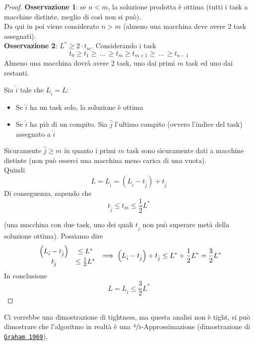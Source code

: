 \begin{proof}
	\textbf{Osservazione 1}: se $n<m$, la soluzione prodotta è ottima (tutti i task a macchine distinte, meglio di così non si può).\\
	
	Da qui in poi viene considerato $n>m$ (almeno una macchina deve avere 2 task assegnati).\\
	
	\textbf{Osservazione 2}: $L^\ast \geq 2 \cdot t_m$. Considerando i task
	$$ t_0 \geq t_1 \geq \, ... \, \geq t_m \geq t_{m+1} \geq \, ... \, \geq t_{n-1} $$
	Almeno una macchina dovrà avere 2 task, uno dai primi $m$ task ed uno dai restanti.\\
	
	\newpage
	
	Sia $\hat{i}$ tale che $L_{\hat{i}} = L$:
	\begin{itemize}
		\item Se $\hat{i}$ ha un task solo, la soluzione è ottima
		\item Se $\hat{i}$ ha più di un compito. Sia $\hat{j}$ l'ultimo compito (ovvero l'indice del task) assegnato a $\hat{i}$
	\end{itemize}
	Sicuramente $\hat{j} \geq m$ in quanto i primi $m$ task sono sicuramente dati a macchine distinte (non può esserci una macchina meno carica di una vuota).\\
	
	Quindi 
	$$ L = L_{\hat{i}} = \left(L_{\hat{i}} - t_{\hat{j}}\right) + t_{\hat{j}} $$  
	Di conseguenza, sapendo che
	$$ t_{\hat{j}} \leq t_m \leq \frac{1}{2} L^\ast $$
	
	(una macchina con due task, uno dei quali $t_{\hat j}$ non può superare metà della soluzione ottima). Possiamo dire
	$$
	\begin{array}{c c}
		\left(L_{\hat{i}} - t_{\hat{j}}\right)  & \leq L^\ast \\
		t_{\hat{j}} & \leq \frac{1}{2} L^\ast
	\end{array}
	\implies
	\left(L_{\hat{i}} - t_{\hat{j}}\right) + t_{\hat{j}}  \leq L^\ast + \frac{1}{2} L^\ast = \frac{3}{2} L^\ast
	$$
	In conclusione
	$$ L = L_{\hat{i}} \leq \frac{3}{2}L^\ast $$
	
\end{proof}

Ci vorrebbe una dimostrazione di tightness, ma questa analisi non è tight, si può dimostrare che l'algoritmo in realtà è una $\sfrac{4}{3}$-Approssimazione (dimostrazione di \href{https://people.irisa.fr/Sophie.Pinchinat/AA/Graham1969SIAM.pdf}{\texttt{Graham 1969}}).\\


